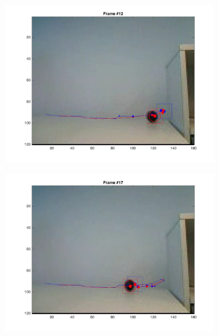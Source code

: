 \documentclass{ethz_report}
\begin{document}
\begin{figure}[h]
\begin{subfigure}[b]{.25\textwidth}
        \includegraphics[width=1\linewidth]{images/video3_observe_low_11}
    \end{subfigure}%
    \begin{subfigure}[b]{.25\textwidth}
        \centering
        \includegraphics[width=1\linewidth]{images/video3_observe_low_16}
    \end{subfigure}
    \begin{subfigure}[b]{.25\textwidth}
        \centering

\end{subfigure}
\end{figure}
\end{document}
